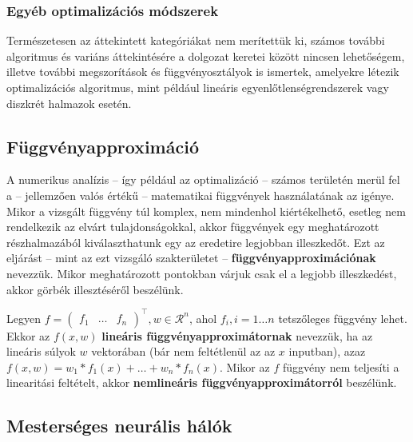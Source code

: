 \subsubsection{Egyéb optimalizációs módszerek}
Természetesen az áttekintett kategóriákat nem merítettük ki, számos további algoritmus és variáns áttekintésére a dolgozat keretei között nincsen lehetőségem, illetve további megszorítások és függvényosztályok is ismertek, amelyekre létezik optimalizációs algoritmus, mint például lineáris egyenlőtlenségrendszerek vagy diszkrét halmazok esetén.

\subsection{Függvényapproximáció}

A numerikus analízis -- így például az optimalizáció -- számos területén merül fel a -- jellemzően valós értékű -- matematikai függvények használatának az igénye. Mikor a vizsgált függvény túl komplex, nem mindenhol kiértékelhető, esetleg nem rendelkezik az elvárt tulajdonságokkal, akkor függvények egy meghatározott részhalmazából kiválaszthatunk egy az eredetire legjobban illeszkedőt. Ezt az eljárást -- mint az ezt vizsgáló szakterületet -- \textbf{függvényapproximációnak} nevezzük. Mikor meghatározott pontokban várjuk csak el a legjobb illeszkedést, akkor görbék illesztéséről beszélünk.


Legyen $f = \left(\begin{smallmatrix}f_1 & \ldots & f_n\end{smallmatrix}\right)^\top, w \in \mathcal{R}^n$, ahol $f_i, i=1 \ldots n$ tetszőleges függvény lehet. Ekkor az $f(x, w)$ \textbf{lineáris függvényapproximátornak} nevezzük, ha az lineáris súlyok $w$ vektorában (bár nem feltétlenül az az $x$ inputban), azaz $f(x,w) = w_1*f_1(x) + \ldots + w_n*f_n(x)$. Mikor az $f$ függvény nem teljesíti a linearitási feltételt, akkor \textbf{nemlineáris függvényapproximátorról} beszélünk.

\subsection{Mesterséges neurális hálók}

